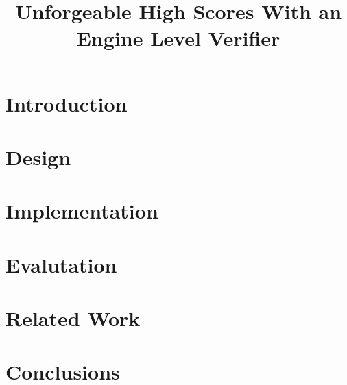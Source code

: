 \documentclass [11pt] {article}
\begin{document}
 

\title { Unforgeable High Scores With an Engine Level Verifier } 

\maketitle 

\section { Introduction }

\section { Design } 

\section { Implementation } 

\section { Evalutation } 

\section { Related Work } 

\section { Conclusions } 
\end{document}
